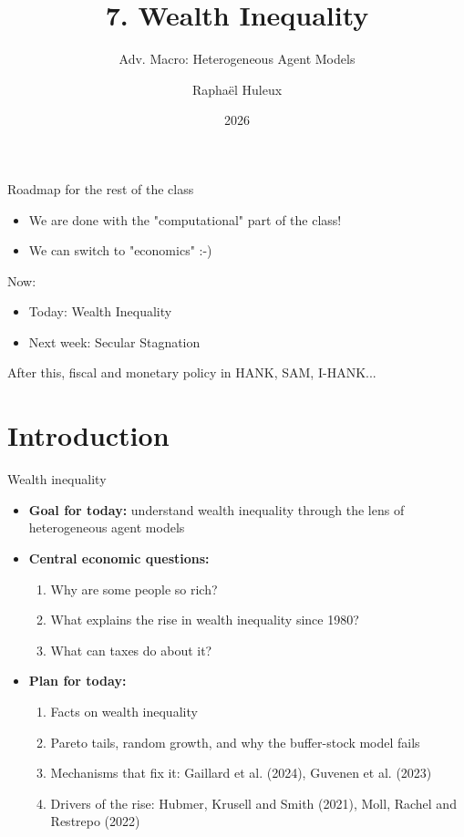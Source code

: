 \documentclass[10pt,english,10pt,handout]{beamer}
\begin{document}
\title{7. Wealth Inequality \vspace{-2mm}}
\subtitle{Adv. Macro: Heterogeneous Agent Models}
\author{Raphaël Huleux}
\date{2026}

{
\begin{frame}

\maketitle

\end{frame}
}

\addtocounter{framenumber}{-1}

\begin{frame}{Roadmap for the rest of the class}

\begin{itemize}
\item We are done with the "computational" part of the class!
\item We can switch to "economics" :-)
\end{itemize}

Now:
\begin{itemize}
\item[7.] Today: Wealth Inequality
\item[8.] Next week: Secular Stagnation
\end{itemize}
After this, fiscal and monetary policy in HANK, SAM, I-HANK...
\end{frame}

\section{Introduction}

\begin{frame}{Wealth inequality}
\begin{itemize}
\item \textbf{Goal for today:} understand wealth inequality through the lens of heterogeneous agent models
\item \textbf{Central economic questions:}
\begin{enumerate}
\item Why are some people so rich?
\item What explains the rise in wealth inequality since 1980?
\item What can taxes do about it?
\end{enumerate}
\item \textbf{Plan for today:}
\begin{enumerate}
\item Facts on wealth inequality
\item Pareto tails, random growth, and why the buffer-stock model fails
\item Mechanisms that fix it: Gaillard et al. (2024), Guvenen et al. (2023)
\item Drivers of the rise: Hubmer, Krusell and Smith (2021), Moll, Rachel and Restrepo (2022)
\end{enumerate}
\end{itemize}
\end{frame}
\end{document}
